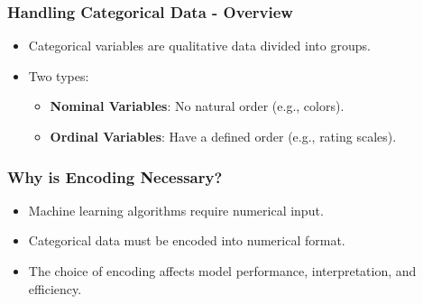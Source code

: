 \documentclass[aspectratio=169]{beamer}
\begin{document}
\begin{frame}[fragile]
    \frametitle{Handling Categorical Data - Overview}
    \begin{itemize}
        \item Categorical variables are qualitative data divided into groups.
        \item Two types:
        \begin{itemize}
            \item \textbf{Nominal Variables}: No natural order (e.g., colors).
            \item \textbf{Ordinal Variables}: Have a defined order (e.g., rating scales).
        \end{itemize}
    \end{itemize}
\end{frame}

\begin{frame}[fragile]
    \frametitle{Why is Encoding Necessary?}
    \begin{itemize}
        \item Machine learning algorithms require numerical input.
        \item Categorical data must be encoded into numerical format.
        \item The choice of encoding affects model performance, interpretation, and efficiency.
    \end{itemize}
\end{frame}
\end{document}
